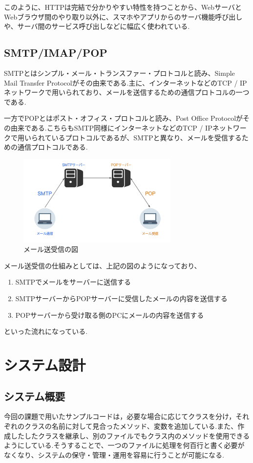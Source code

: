 \documentclass[submit,techrep]{ipsj}
\begin{document}
このように、HTTPは完結で分かりやすい特性を持つことから、WebサーバとWebブラウザ間のやり取り以外に、スマホやアプリからのサーバ機能呼び出しや、サーバ間のサービス呼び出しなどに幅広く使われている.

\subsection{SMTP/IMAP/POP}
SMTPとはシンプル・メール・トランスファー・プロトコルと読み、Simple Mail Transfer Protocolがその由来である.主に、インターネットなどのTCP / IPネットワークで用いられており、メールを送信するための通信プロトコルの一つである.

一方でPOPとはポスト・オフィス・プロトコルと読み、Post Office Protocolがその由来である.こちらもSMTP同様にインターネットなどのTCP / IPネットワークで用いられているプロトコルであるが、SMTPと異なり、メールを受信するための通信プロトコルである.

\begin{figure}[htbp]
  \centering
 \includegraphics[width=8cm]{./images/mail.jpg}
  \caption{メール送受信の図}
  \label{fig:sample}
\end{figure}



メール送受信の仕組みとしては、上記の図のようになっており、

\begin{enumerate}
  \item SMTPでメールをサーバーに送信する
  \item SMTPサーバーからPOPサーバーに受信したメールの内容を送信する
  \item  POPサーバーから受け取る側のPCにメールの内容を送信する
  \end{enumerate}
といった流れになっている.


\section{システム設計}
\subsection{システム概要}
今回の課題で用いたサンプルコードは，必要な場合に応じてクラスを分け，それぞれのクラスの名前に対して見合ったメソッド、変数を追加している.また、作成したしたクラスを継承し、別のファイルでもクラス内のメソッドを使用できるようにしている.そうすることで、一つのファイルに処理を何百行と書く必要がなくなり、システムの保守・管理・運用を容易に行うことが可能になる.
\end{document}
